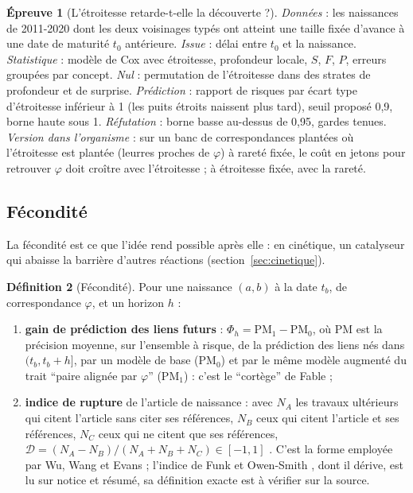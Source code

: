 \documentclass[11pt,a4paper]{article}
\theoremstyle{definition}
\newtheorem{definition}{Définition}[section]
\newtheorem{test}[definition]{Épreuve}
\theoremstyle{plain}
\begin{document}
\begin{test}[L'étroitesse retarde-t-elle la découverte ?]
\label{test:etroitesse}
\emph{Données} : les naissances de 2011-2020 dont les deux voisinages typés ont atteint une taille
fixée d'avance à une date de maturité $t_0$ antérieure. \emph{Issue} : délai entre $t_0$ et la
naissance. \emph{Statistique} : modèle de Cox avec étroitesse, profondeur locale, $S$, $F$, $P$,
erreurs groupées par concept. \emph{Nul} : permutation de l'étroitesse dans des strates de
profondeur et de surprise. \emph{Prédiction} : rapport de risques par écart type d'étroitesse
inférieur à 1 (les puits étroits naissent plus tard), seuil proposé 0,9, borne haute sous 1.
\emph{Réfutation} : borne basse au-dessus de 0,95, gardes tenues. \emph{Version dans l'organisme} :
sur un banc de correspondances plantées où l'étroitesse est plantée (leurres proches de $\varphi$) à
rareté fixée, le coût en jetons pour retrouver $\varphi$ doit croître avec l'étroitesse ; à
étroitesse fixée, avec la rareté.
\end{test}

\subsection{Fécondité}
\label{sec:fecondite}

La fécondité est ce que l'idée rend possible après elle : en cinétique, un catalyseur qui abaisse
la barrière d'autres réactions \cite[point (3)]{complementspectral} (section~\ref{sec:cinetique}).

\begin{definition}[Fécondité]
\label{def:fecondite}
Pour une naissance $(a,b)$ à la date $t_b$, de correspondance $\varphi$, et un horizon $h$ :
\begin{enumerate}
\item \textbf{gain de prédiction des liens futurs} : $\Phi_h=\mathrm{PM}_1-\mathrm{PM}_0$, où
$\mathrm{PM}$ est la précision moyenne, sur l'ensemble à risque, de la prédiction des liens nés dans
$(t_b,t_b+h]$, par un modèle de base ($\mathrm{PM}_0$) et par le même modèle augmenté du trait
\enquote{paire alignée par $\varphi$} ($\mathrm{PM}_1$) : c'est le \enquote{cortège} de Fable
\cite[partie~7, C]{fable} ;
\item \textbf{indice de rupture} de l'article de naissance : avec $N_A$ les travaux ultérieurs qui
citent l'article sans citer ses références, $N_B$ ceux qui citent l'article et ses références,
$N_C$ ceux qui ne citent que ses références,
$\mathcal{D}=(N_A-N_B)/(N_A+N_B+N_C)\in[-1,1]$ \cite[p.~7, légende de la figure~1 ; p.~18]{wu2019}.
C'est la forme employée par Wu, Wang et Evans ; l'indice de Funk et Owen-Smith \cite{funk2017}, dont
il dérive, est lu sur notice et résumé, sa définition exacte est à vérifier sur la source.
\end{enumerate}
\end{definition}
\end{document}
